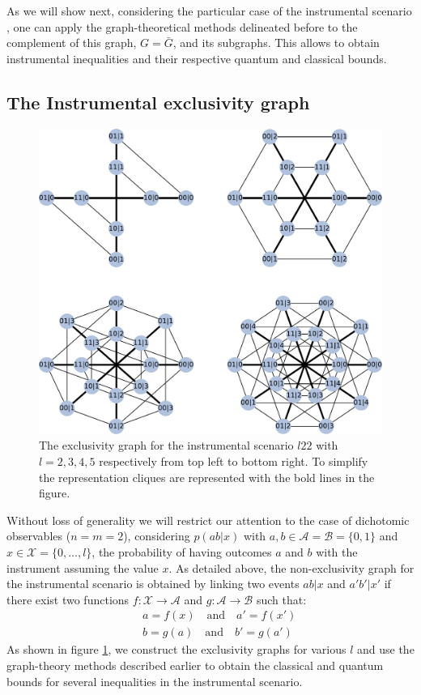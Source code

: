 \documentclass[letterpaper]{article}
\begin{document}
As we will show next, considering the particular case of the instrumental
scenario \cite{}, one can apply the graph-theoretical methods delineated before
to the complement of this graph, $G=\bar{G}$, and its subgraphs. This allows to
obtain instrumental inequalities and their respective quantum and
classical bounds.

\subsection{The Instrumental exclusivity graph}
\begin{figure}[t]
    \centering
    \includegraphics[width=.7\textwidth]{images/instrumental_exgraph.pdf}
    \caption{
    The exclusivity graph for the instrumental scenario $l22$ with $l=2,3,4,5$
    respectively from top left to bottom right. 
    To simplify the representation cliques are represented with the bold lines
    in the figure.}
    \label{fig:instrumental_exgraphs}
\end{figure}


Without loss of generality we will restrict our attention to the case of
dichotomic observables ($n = m = 2$), considering $p(ab|x)$ with $a, b \in
\mathcal{A} = \mathcal{B} = \{0,1\}$ and $x \in
\mathcal{X} = \{0,\ldots,l\}$, the probability of having outcomes $a$ and $b$
with the instrument assuming the value $x$. As detailed above, the
non-exclusivity graph for the instrumental scenario is obtained by linking two
events $ab|x$ and $a'b'|x'$ if there exist two functions $f:\mathcal{X}
\rightarrow \mathcal{A}$ and $g:\mathcal{A} \rightarrow
\mathcal{B}$ such that:
\begin{eqnarray}
   & &  a = f(x) \quad\text{and}\quad a'=f(x')\\ \nonumber
& & b = g(a) \quad\text{and}\quad b'=g(a')
    \label{eq:non_exclusivity_condition}
\end{eqnarray}
As shown in figure \ref{fig:instrumental_exgraphs}, we construct the exclusivity
graphs for various $l$ and use the graph-theory methods described earlier to
obtain the classical and quantum bounds for several inequalities in the
instrumental scenario. 
\end{document}
